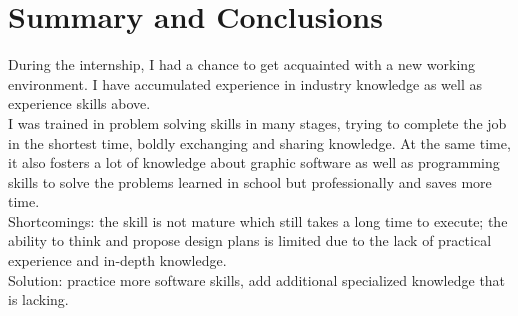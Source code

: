 \chapter{Summary and Conclusions}
During the internship, I had a chance to get acquainted with a new working environment. I have accumulated experience in industry knowledge as well as experience skills above.\\
I was trained in problem solving skills in many stages, trying to complete the job in the shortest time, boldly exchanging and sharing knowledge. At the same time, it also fosters a lot of knowledge about graphic software as well as programming skills to solve the problems learned in school but professionally and saves more time.\\
Shortcomings: the skill is not mature which still takes a long time to execute; the ability to think and propose design plans is limited due to the lack of practical experience and in-depth knowledge.\\
Solution: practice more software skills, add additional specialized knowledge that is lacking.